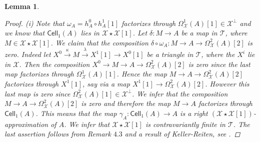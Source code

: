 \documentclass[oneside, a4paper,reqno]{amsart}
\numberwithin{equation}{section}
\newtheorem{lem}[thm]{Lemma}
\theoremstyle{definition}
\begin{document}
\begin{lem}
\begin{proof}
(i) Note that $\omega_{A} = h^{0}_{A} \circ h^{1}_{A}[1]$ factorizes through $\Omega^{1}_{\mathcal X}(A)[1] \in {\mathcal X}^{\bot}$  and we know that $\mathsf{Cell}_{1}(A)$ lies in ${\mathcal X}\star {\mathcal X}[1]$.  Let $\delta \colon M {\longrightarrow} A$ be a map in ${\mathcal T}$, where $M \in {\mathcal X}\star{\mathcal X}[1]$.  We claim that the composition $\delta \circ \omega_{A} \colon M{\longrightarrow} A {\longrightarrow}  \Omega^{2}_{\mathcal X}(A)[2]$ is zero. Indeed let $X^{0} \stackrel{\kappa}{\longrightarrow} M \stackrel{\lambda}{\longrightarrow} X^{1}[1] {\longrightarrow} X^{0}[1]$ be a triangle in ${\mathcal T}$, where the $X^{i}$ lie in ${\mathcal X}$.  Then the composition $X^{0} {\longrightarrow} M {\longrightarrow} A {\longrightarrow} \Omega^{2}_{\mathcal X}(A)[2]$ is zero since the last map factorizes through $\Omega^{1}_{\mathcal X}(A)[1]$. Hence the map $M {\longrightarrow} A {\longrightarrow} \Omega^{2}_{\mathcal X}(A)[2]$ factorizes through $X^{1}[1]$, say via a map $X^{1}[1] {\longrightarrow} \Omega^{2}_{\mathcal X}(A)[2]$. However this last map is zero since $\Omega^{2}_{\mathcal X}(A)[1] \in {\mathcal X}^{\bot}$. We infer that the composition  $M {\longrightarrow} A {\longrightarrow} \Omega^{2}_{\mathcal X}(A)[2]$ is zero and therefore the map $M {\longrightarrow} A$ factorizes through $\mathsf{Cell}_{1}(A)$. This means that the map $\gamma_{A} \colon \mathsf{Cell}_{1}(A) {\longrightarrow} A$ is a right $({\mathcal X}\star{\mathcal X}[1])$-approximation of $A$. We infer that ${\mathcal X}\star {\mathcal X}[1]$ is contravariantly finite in ${\mathcal T}$.  The last assertion follows from Remark $4.3$ and a result of Keller-Reiten, see \cite[Lemma 5.1]{KR1}.


\end{proof}
\end{lem}
\end{document}
